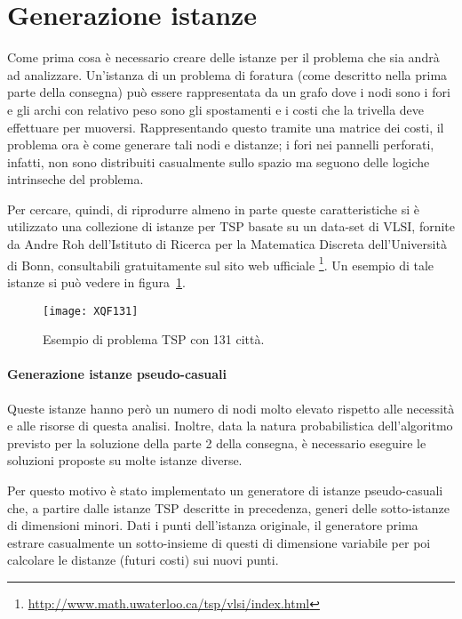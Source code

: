 
\section{Generazione istanze}\label{sec:generazione-istanze}
Come prima cosa è necessario creare delle istanze per il problema che sia andrà ad analizzare.
Un'istanza di un problema di foratura (come descritto nella prima parte della consegna) può essere rappresentata
da un grafo dove i nodi sono i fori e gli archi con relativo peso sono gli spostamenti e i costi che la trivella
deve effettuare per muoversi.
Rappresentando questo tramite una matrice dei costi, il problema ora è come generare tali nodi e distanze;
i fori nei pannelli perforati, infatti, non sono distribuiti casualmente sullo spazio ma seguono delle
logiche intrinseche del problema.

Per cercare, quindi, di riprodurre almeno in parte queste caratteristiche si è utilizzato una collezione di istanze
per TSP basate su un data-set di VLSI, fornite da Andre Roh dell'Istituto di Ricerca per la Matematica Discreta
dell'Università di Bonn, consultabili gratuitamente sul sito web ufficiale
\footnote{\url{http://www.math.uwaterloo.ca/tsp/vlsi/index.html}}.
Un esempio di tale istanze si può vedere in figura~\ref{fig:istanza-tsp-XQF131}.
%
\begin{figure}[!h]
\begin{center}
	\texttt{[image: XQF131]}
{\scriptsize \caption{Esempio di problema TSP con 131 città.}
\label{fig:istanza-tsp-XQF131}}
\end{center}
\end{figure}
%
\paragraph{Generazione istanze pseudo-casuali}
Queste istanze hanno però un numero di nodi molto elevato rispetto alle necessità
e alle risorse di questa analisi.
Inoltre, data la natura probabilistica dell'algoritmo previsto per la soluzione della parte 2 della consegna,
è necessario eseguire le soluzioni proposte su molte istanze diverse.

Per questo motivo è stato implementato un generatore di istanze pseudo-casuali che, a partire dalle istanze TSP
descritte in precedenza, generi delle sotto-istanze di dimensioni minori.
Dati i punti dell'istanza originale, il generatore prima estrare casualmente un sotto-insieme di questi
di dimensione variabile per poi calcolare le distanze (futuri costi) sui nuovi punti.

